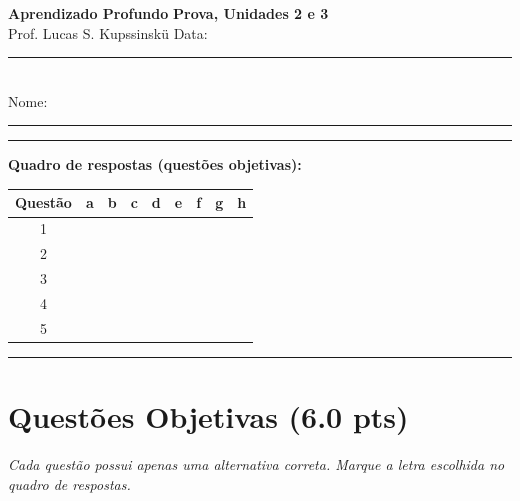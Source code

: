\documentclass[11pt,a4paper]{article}
\begin{document}
{\Large\bfseries Aprendizado Profundo} \hfill \textbf{Prova, Unidades 2 e 3}\\
Prof. Lucas S. Kupssinskü \hfill Data: \rule{3cm}{0.4pt}\\[0.4em]
Nome: \rule{12cm}{0.4pt}

\rule{\linewidth}{0.8pt}

\textbf{Quadro de respostas (questões objetivas):}\\[0.3em]
\begin{center}
\begin{tabular}{|c|c|c|c|c|c|c|c|c|}
\hline
\textbf{Questão} & \textbf{a} & \textbf{b} & \textbf{c} & \textbf{d} & \textbf{e} & \textbf{f} & \textbf{g} & \textbf{h} \\\hline
1 & & & & & & & & \\\hline
2 & & & & & & & & \\\hline
3 & & & & & & & & \\\hline
4 & & & & & & & & \\\hline
5 & & & & & & & & \\\hline
\end{tabular}
\end{center}

\rule{\linewidth}{0.4pt}

\section*{Questões Objetivas (6.0 pts)}
\textit{Cada questão possui apenas uma alternativa correta. Marque a letra escolhida no quadro de respostas.}
\end{document}
